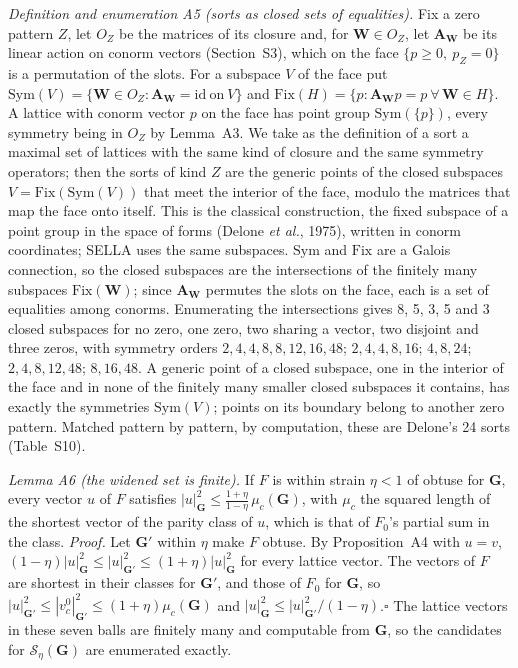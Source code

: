 \documentclass[preprint,pdf]{iucr}          %
\newcommand{\Gmet}{\mathbf{G}}
\newcommand{\Wop}{\mathbf{W}}
\newcommand{\Se}{\mathcal{S}_\eta}
\begin{document}
\emph{Definition and enumeration A5 (sorts as closed sets of equalities).} Fix a zero pattern $Z$, let $O_Z$ be the matrices of its closure and, for $\Wop\in O_Z$, let $\mathbf A_{\Wop}$ be its linear action on conorm vectors (Section~S3), which on the face $\{p\ge0,\ p_Z=0\}$ is a permutation of the slots. For a subspace $V$ of the face put $\mathrm{Sym}(V)=\{\Wop\in O_Z: \mathbf A_{\Wop}=\mathrm{id}\ \text{on}\ V\}$ and $\mathrm{Fix}(H)=\{p: \mathbf A_{\Wop} p=p\ \forall\,\Wop\in H\}$. A lattice with conorm vector $p$ on the face has point group $\mathrm{Sym}(\{p\})$, every symmetry being in $O_Z$ by Lemma~A3. We take as the definition of a sort a maximal set of lattices with the same kind of closure and the same symmetry operators; then the sorts of kind $Z$ are the generic points of the closed subspaces $V=\mathrm{Fix}(\mathrm{Sym}(V))$ that meet the interior of the face, modulo the matrices that map the face onto itself. This is the classical construction, the fixed subspace of a point group in the space of forms (Delone \emph{et al.}, 1975), written in conorm coordinates; SELLA uses the same subspaces. $\mathrm{Sym}$ and $\mathrm{Fix}$ are a Galois connection, so the closed subspaces are the intersections of the finitely many subspaces $\mathrm{Fix}(\Wop)$; since $\mathbf A_{\Wop}$ permutes the slots on the face, each is a set of equalities among conorms. Enumerating the intersections gives 8, 5, 3, 5 and 3 closed subspaces for no zero, one zero, two sharing a vector, two disjoint and three zeros, with symmetry orders $2,4,4,8,\allowbreak 8,12,16,48$; $2,4,4,8,16$; $4,8,24$; $2,4,8,\allowbreak 12,48$; $8,16,48$. A generic point of a closed subspace, one in the interior of the face and in none of the finitely many smaller closed subspaces it contains, has exactly the symmetries $\mathrm{Sym}(V)$; points on its boundary belong to another zero pattern. Matched pattern by pattern, by computation, these are Delone's 24 sorts (Table~S10).

\emph{Lemma A6 (the widened set is finite).} If $F$ is within strain $\eta<1$ of obtuse for $\Gmet$, every vector $u$ of $F$ satisfies $|u|^2_{\Gmet}\le\frac{1+\eta}{1-\eta}\,\mu_c(\Gmet)$, with $\mu_c$ the squared length of the shortest vector of the parity class of $u$, which is that of $F_0$'s partial sum in the class. \emph{Proof.} Let $\Gmet'$ within $\eta$ make $F$ obtuse. By Proposition~A4 with $u=v$, $(1-\eta)|u|^2_{\Gmet}\le|u|^2_{\Gmet'}\le(1+\eta)|u|^2_{\Gmet}$ for every lattice vector. The vectors of $F$ are shortest in their classes for $\Gmet'$, and those of $F_0$ for $\Gmet$, so $|u|^2_{\Gmet'}\le|v^0_c|^2_{\Gmet'}\le(1+\eta)\mu_c(\Gmet)$ and $|u|^2_{\Gmet}\le|u|^2_{\Gmet'}/(1-\eta)$.\hfill$\square$ The lattice vectors in these seven balls are finitely many and computable from $\Gmet$, so the candidates for $\Se(\Gmet)$ are enumerated exactly.
\end{document}
